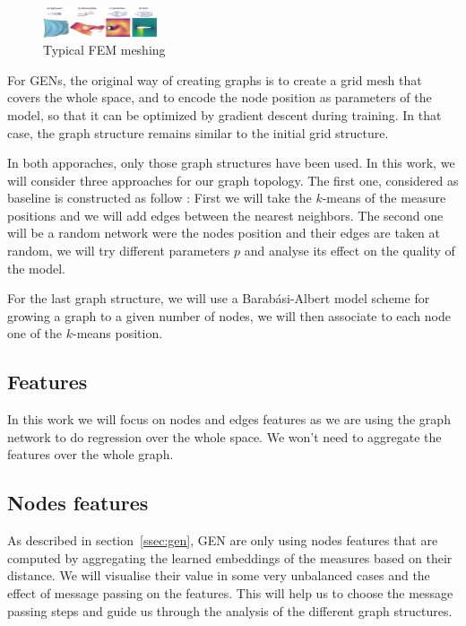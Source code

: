 \documentclass[a4paper,10pt]{article}
\newcommand{\ap}[1]{\marginpar{{\tiny \color{red} [AP] #1}}}
\begin{document}
\begin{figure}
  \centering
  \includegraphics[trim={780 0 300 50},clip,width=0.3\textwidth]{figs/mesh-dataset}
  \caption{Typical FEM meshing \cite{pfaff2020learning}}
\end{figure}

For GENs, the original way of creating graphs is to create a grid mesh that covers the whole space, and to encode the node position as parameters of the model, so that it can be optimized by gradient descent during training. In that case, the graph structure remains similar to the initial grid structure.

\ap{TODO : graph}

In both apporaches, only those graph structures have been used. In this work, we will consider three approaches for our graph topology. The first one, considered as baseline is constructed as follow : First we will take the $k$-means of the measure positions and we will add edges between the nearest neighbors. The second one will be a random network were the nodes position and their edges are taken at random, we will try different parameters $p$ and analyse its effect on the quality of the model.

For the last graph structure, we will use a Barab\'asi-Albert model scheme for growing a graph to a given number of nodes, we will then associate to each node one of the $k$-means position.
\ap{TODO : graph}


\subsection{Features}

In this work we will focus on nodes and edges features as we are using the graph network to do regression over the whole space. We won't need to aggregate the features over the whole graph.


\subsection{Nodes features}
As described in section~\ref{ssec:gen}, GEN are only using nodes features that are computed by aggregating the learned embeddings of the measures based on their distance. We will visualise their value in some very unbalanced cases and the effect of message passing on the features. This will help us to choose the message passing steps and guide us through the analysis of the different graph structures.
\end{document}
